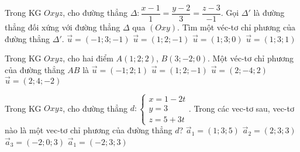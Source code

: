 	\begin{ex}%
	Trong KG $Oxyz$, cho đường thẳng $\Delta\colon \dfrac{x-1}{1}=\dfrac{y-2}{3}=\dfrac{z-3}{-1}$. Gọi $\Delta'$ là đường thẳng đối xứng với đường thẳng $\Delta$ qua $(Oxy)$. Tìm một véc-tơ chỉ phương của đường thẳng $\Delta'$.
	\choice
	{$\overrightarrow{u}=(-1;3;-1)$}
	{$\overrightarrow{u}=(1;2;-1)$}
	{$\overrightarrow{u}=(1;3;0)$}
	{\True $\overrightarrow{u}=(1;3;1)$}
	\end{ex}
	\begin{ex}%
	Trong KG $Oxyz$, cho hai điểm $A(1;2;2)$, $B(3;-2;0)$. Một véc-tơ chỉ phương của đường thẳng $AB$ là
	\choice
	{\True $\overrightarrow{u}=(-1;2;1)$}
	{$\overrightarrow{u}=(1;2;-1)$}
	{$\overrightarrow{u}=(2;-4;2)$}
	{$\overrightarrow{u}=(2;4;-2)$}
	\end{ex}
	\begin{ex}%
	Trong KG $Oxyz$, cho đường thẳng $d:\begin{cases}x=1-2t \\ y=3 \\ z=5+3t \end{cases}$. Trong các vec-tơ sau, vec-tơ nào là một vec-tơ chỉ phương của đường thẳng $d$?
	\choice
	{$\overrightarrow{a}_1=(1;3;5)$}
	{$\overrightarrow{a}_2=(2;3;3)$}
	{\True $\overrightarrow{a}_3=(-2;0;3)$}
	{$\overrightarrow{a}_1=(-2;3;3)$}
	\end{ex}
